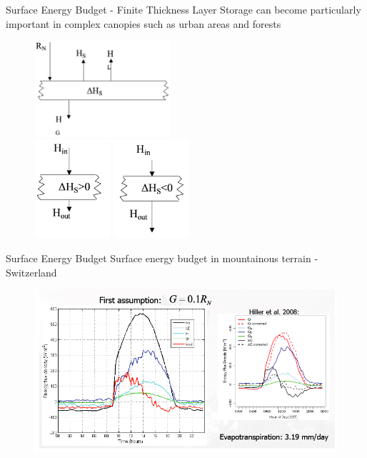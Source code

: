 \begin{frame}{Surface Energy Budget - Finite Thickness Layer}
Storage can become particularly important in complex canopies such as urban areas and forests
\begin{figure}
	\includegraphics[width=0.45\textwidth]{rad9.png}\\
	\includegraphics[width=0.25\textwidth]{rad10.png}
	\includegraphics[width=0.25\textwidth]{rad11.png}\\
	\vspace{-10pt}
\end{figure}
\end{frame}

\begin{frame}{Surface Energy Budget}
Surface energy budget in mountainous terrain - Switzerland
\begin{figure}
	\includegraphics[width=1\textwidth]{rad12.png}\\
\end{figure}
\end{frame}

